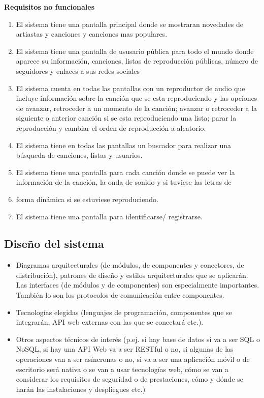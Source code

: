 \documentclass[12pt]{article}%
\begin{document}
\textbf{Requisitos no funcionales}
\begin{enumerate}
	\item El sistema tiene una pantalla principal donde se mostraran novedades de artiastas y canciones y canciones mas populares.
	\item El sistema tiene una pantalla de ususario p\'ublica para todo el mundo donde aparece su informaci\'on, canciones, listas de reproducci\'on p\'ublicas, n\'umero de seguidores y enlaces a sus redes sociales
	\item El sistema cuenta en todas las pantallas con un reproductor de audio que incluye informaci\'on sobre la canci\'on que se esta reproduciendo y las opciones de avanzar, retroceder a un momento de la canci\'on; avanzar o retroceder a la siguiente o anterior canci\'on si se esta reproduciendo una lista; parar la reproducci\'on y cambiar el orden de reproducci\'on a aleatorio.
	\item El sistema tiene en todas las pantallas un buscador para realizar una b\'usqueda de canciones, listas y usuarios.
	\item El sistema tiene una pantalla para cada canci\'on donde se puede ver la  informaci\'on de la canci\'on, la onda de sonido y si tuviese las letras de \item forma din\'amica si se estuviese reproduciendo.
	\item El sistema tiene una pantalla para identificarse/ registrarse.
\end{enumerate}

\subsection{Dise\~no del sistema}
\begin{itemize}
	\item Diagramas arquitecturales (de m\'odulos, de componentes y conectores, de distribuci\'on), patrones de dise\~no y estilos arquitecturales que se aplicar\'an. Las interfaces (de m\'odulos y de componentes) son especialmente importantes. Tambi\'en lo son los protocolos de comunicaci\'on entre componentes.
	\item Tecnolog\'ias elegidas (lenguajes de programaci\'on, componentes que se integrar\'an, API web externas con las que se conectar\'a etc.).
	\item Otros aspectos t\'ecnicos de inter\'es (p.ej. si hay base de datos si va a ser SQL o NoSQL, si hay una API Web va a ser RESTful o no, si algunas de las operaciones van a ser as\'incronas o no, si va a ser una aplicaci\'on m\'ovil o de escritorio ser\'a nativa o se van a usar tecnolog\'ias web, c\'omo se van a considerar los requisitos de seguridad o de prestaciones, c\'omo y d\'onde se har\'an las instalaciones y despliegues etc.)
\end{itemize}
\end{document}
